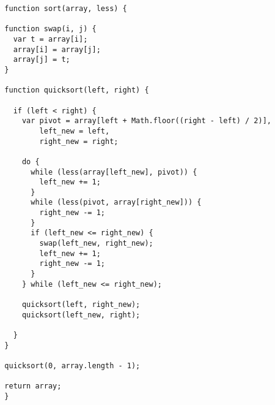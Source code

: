 \documentclass{article}
\begin{document}
\begin{verbatim}
  function sort(array, less) {
  
  function swap(i, j) {
    var t = array[i];
    array[i] = array[j];
    array[j] = t;
  }

  function quicksort(left, right) {

    if (left < right) {
      var pivot = array[left + Math.floor((right - left) / 2)],
          left_new = left,
          right_new = right;

      do {
        while (less(array[left_new], pivot)) {
          left_new += 1;
        }
        while (less(pivot, array[right_new])) {
          right_new -= 1;
        }
        if (left_new <= right_new) {
          swap(left_new, right_new);
          left_new += 1;
          right_new -= 1;
        }
      } while (left_new <= right_new);

      quicksort(left, right_new);
      quicksort(left_new, right);

    }
  }

  quicksort(0, array.length - 1);

  return array;
  }
\end{verbatim}
\end{document}
